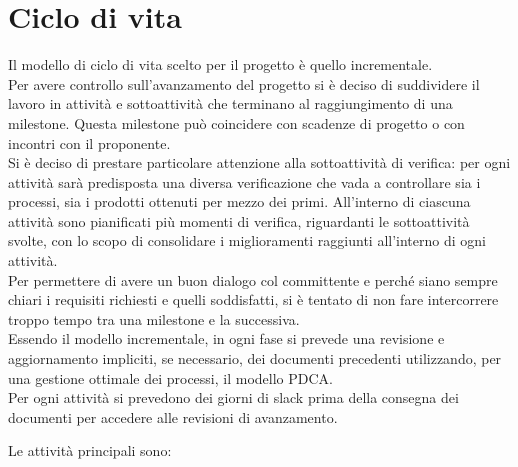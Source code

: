 \documentclass[a4paper, titlepage]{article}
\begin{document}
	\section{Ciclo di vita}\label{Ciclo di vita}
	Il modello di ciclo di vita scelto per il progetto è quello incrementale.\\
	Per avere controllo sull'avanzamento del progetto si è deciso di suddividere il lavoro in attività e sottoattività che terminano al raggiungimento di una milestone. Questa milestone può coincidere con scadenze di progetto o con incontri con il proponente.\\
	Si è deciso di prestare particolare attenzione alla sottoattività di verifica: per ogni attività sarà predisposta una diversa verificazione che vada a controllare sia i processi, sia i prodotti ottenuti per mezzo dei primi. All’interno di ciascuna attività sono pianificati più momenti di verifica, riguardanti le sottoattività svolte, con lo scopo di consolidare i miglioramenti raggiunti all'interno di ogni attività.\\
	Per permettere di avere un buon dialogo col committente e perché siano sempre chiari i requisiti richiesti e quelli soddisfatti, si è tentato di non fare intercorrere troppo tempo tra una milestone e la successiva.\\
	Essendo il modello incrementale, in ogni fase si prevede una revisione e aggiornamento impliciti, se necessario, dei documenti precedenti utilizzando, per una gestione ottimale dei processi, il modello PDCA.\\
	Per ogni attività si prevedono dei giorni di slack prima della consegna dei documenti per accedere alle revisioni di avanzamento.
	
	Le attività principali sono:
	
\end{document}
